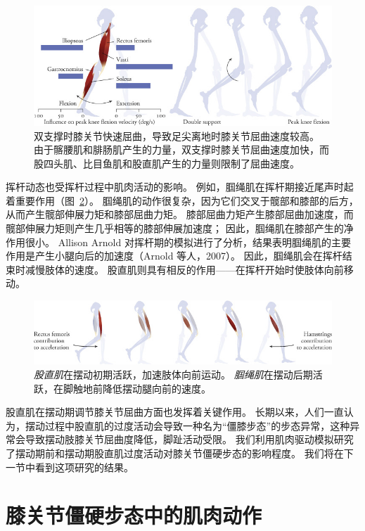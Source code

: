 \begin{figure}[!htb]
	\centering
	\includegraphics[width=1.0\linewidth]{chap11/11_4}
	\caption{双支撑时膝关节快速屈曲，导致足尖离地时膝关节屈曲速度较高。
		由于髂腰肌和腓肠肌产生的力量，双支撑时膝关节屈曲速度加快，而股四头肌、比目鱼肌和股直肌产生的力量则限制了屈曲速度\cite{goldberg2004muscles}。 \label{fig:11_4}}
\end{figure}


挥杆动态也受挥杆过程中肌肉活动的影响。
例如，腘绳肌在挥杆期接近尾声时起着重要作用（图~\ref{fig:11_5}）。
腘绳肌的动作很复杂，因为它们交叉于髋部和膝部的后方，从而产生髋部伸展力矩和膝部屈曲力矩。
膝部屈曲力矩产生膝部屈曲加速度，而髋部伸展力矩则产生几乎相等的膝部伸展加速度；
因此，腘绳肌在膝部产生的净作用很小。
Allison Arnold 对挥杆期的模拟进行了分析，结果表明腘绳肌的主要作用是产生小腿向后的加速度（Arnold 等人，2007）。
因此，腘绳肌会在挥杆结束时减慢肢体的速度。
股直肌则具有相反的作用——在挥杆开始时使肢体向前移动。


\begin{figure}[!htb]
	\centering
	\includegraphics[width=1.0\linewidth]{chap11/11_5}
	\caption{\textit{股直肌}在摆动初期活跃，加速肢体向前运动。
		\textit{腘绳肌}在摆动后期活跃，在脚触地前降低摆动腿向前的速度。 \label{fig:11_5}}
\end{figure}


股直肌在摆动期调节膝关节屈曲方面也发挥着关键作用。
长期以来，人们一直认为，摆动过程中股直肌的过度活动会导致一种名为“僵膝步态”的步态异常，这种异常会导致摆动肢膝关节屈曲度降低，脚趾活动受限。
我们利用肌肉驱动模拟研究了摆动期前和摆动期股直肌过度活动对膝关节僵硬步态的影响程度。
我们将在下一节中看到这项研究的结果。


\section{膝关节僵硬步态中的肌肉动作}

